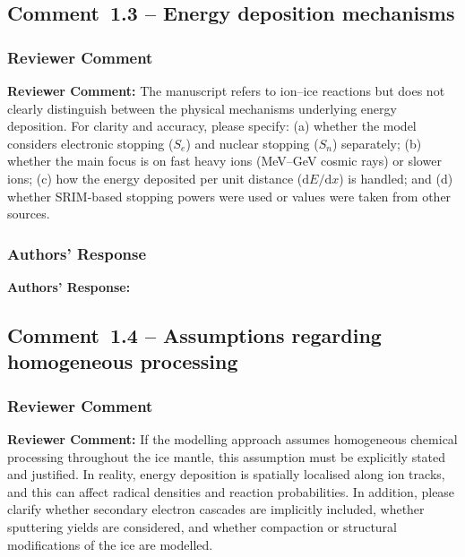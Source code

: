 \documentclass[12pt]{article}
\newcommand{\reviewlabel}{\textbf{\textcolor{commentframe}{Reviewer Comment:}}}
\newcommand{\responselabel}{\textbf{\textcolor{responseframe}{Authors' Response:}}}
\begin{document}
\subsection{Comment~1.3 -- Energy deposition mechanisms}

\subsubsection{Reviewer Comment}
\begin{reviewerbox}
\reviewlabel{} The manuscript refers to ion--ice reactions but does not
clearly distinguish between the physical mechanisms underlying energy
deposition. For clarity and accuracy, please specify: (a) whether the model
considers electronic stopping ($S_e$) and nuclear stopping ($S_n$) separately;
(b) whether the main focus is on fast heavy ions (MeV--GeV cosmic rays) or
slower ions; (c) how the energy deposited per unit distance ($\mathrm{d}E/\mathrm{d}x$)
is handled; and (d) whether SRIM-based stopping powers were used or values
were taken from other sources.
\end{reviewerbox}

\subsubsection{Authors' Response}
\begin{responsebox}
\responselabel{}

\end{responsebox}

\subsection{Comment~1.4 -- Assumptions regarding homogeneous processing}

\subsubsection{Reviewer Comment}
\begin{reviewerbox}
\reviewlabel{} If the modelling approach assumes homogeneous chemical
processing throughout the ice mantle, this assumption must be explicitly
stated and justified. In reality, energy deposition is spatially localised
along ion tracks, and this can affect radical densities and reaction
probabilities. In addition, please clarify whether secondary electron cascades
are implicitly included, whether sputtering yields are considered, and whether
compaction or structural modifications of the ice are modelled.
\end{reviewerbox}
\end{document}
